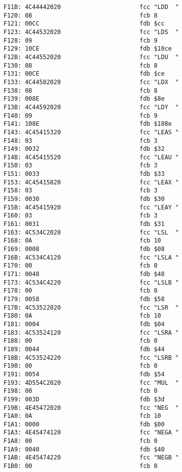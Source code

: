 {\begin{verbatim}
F11B: 4C44442020                      fcc "LDD  "
F120: 08                              fcb 8
F121: 00CC                            fdb $cc
F123: 4C44532020                      fcc "LDS  "
F128: 09                              fcb 9
F129: 10CE                            fdb $10ce
F12B: 4C44552020                      fcc "LDU  "
F130: 08                              fcb 8
F131: 00CE                            fdb $ce
F133: 4C44582020                      fcc "LDX  "
F138: 08                              fcb 8
F139: 008E                            fdb $8e
F13B: 4C44592020                      fcc "LDY  "
F140: 09                              fcb 9
F141: 108E                            fdb $108e
F143: 4C45415320                      fcc "LEAS "
F148: 03                              fcb 3
F149: 0032                            fdb $32
F14B: 4C45415520                      fcc "LEAU "
F150: 03                              fcb 3
F151: 0033                            fdb $33
F153: 4C45415820                      fcc "LEAX "
F158: 03                              fcb 3
F159: 0030                            fdb $30
F15B: 4C45415920                      fcc "LEAY "
F160: 03                              fcb 3
F161: 0031                            fdb $31
F163: 4C534C2020                      fcc "LSL  "
F168: 0A                              fcb 10
F169: 0008                            fdb $08
F16B: 4C534C4120                      fcc "LSLA "
F170: 00                              fcb 0
F171: 0048                            fdb $48
F173: 4C534C4220                      fcc "LSLB "
F178: 00                              fcb 0
F179: 0058                            fdb $58
F17B: 4C53522020                      fcc "LSR  "
F180: 0A                              fcb 10
F181: 0004                            fdb $04
F183: 4C53524120                      fcc "LSRA "
F188: 00                              fcb 0
F189: 0044                            fdb $44
F18B: 4C53524220                      fcc "LSRB "
F190: 00                              fcb 0
F191: 0054                            fdb $54
F193: 4D554C2020                      fcc "MUL  "
F198: 00                              fcb 0
F199: 003D                            fdb $3d
F19B: 4E45472020                      fcc "NEG  "
F1A0: 0A                              fcb 10
F1A1: 0000                            fdb $00
F1A3: 4E45474120                      fcc "NEGA "
F1A8: 00                              fcb 0
F1A9: 0040                            fdb $40
F1AB: 4E45474220                      fcc "NEGB "
F1B0: 00                              fcb 0

\end{verbatim}}
